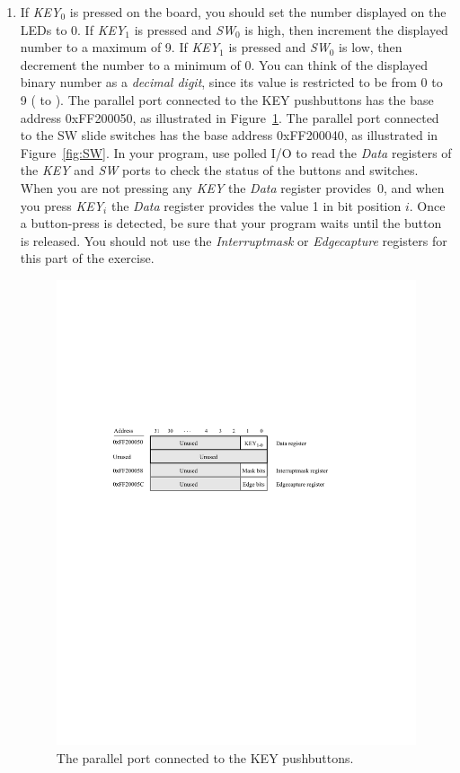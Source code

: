\documentclass[epsfig,10pt,fullpage]{article}
\begin{document}
\begin{enumerate}
\item If {\it KEY}$_0$ is pressed on the board, you should set the number displayed on the
LEDs to 0. If {\it KEY}$_1$ is pressed and {\it SW}$_0$ is high, then increment the displayed
number to a maximum of 9. If {\it KEY}$_1$ is pressed and {\it SW}$_0$ is low, then decrement the
number to a minimum of 0. You can think of the displayed binary number as a {\it decimal digit},
since its value is restricted to be from 0 to 9 ( to ). The 
parallel port connected to the KEY pushbuttons has the base address
{\sf 0xFF200050}, as illustrated in Figure~\ref{fig:KEY}. The parallel port connected to
the SW slide switches has the base address {\sf 0xFF200040}, as illustrated in Figure~\ref{fig:SW}.
In your program, use polled I/O to read the {\it Data} registers of the {\it KEY} and {\it SW}
ports to check the status of the buttons and switches. When you are not pressing 
any {\it KEY} the {\it Data} register provides~0, and when you press {\it KEY}$_i$ the 
{\it Data} register provides the value 1 in bit position $i$. Once a button-press is detected,
be sure that your program waits until the button is released. You should not use the 
{\it Interruptmask} or {\it Edgecapture} registers for this part of the exercise.

\begin{figure}[htb]
	\begin{center}
	\includegraphics[scale=1]{figures/figureKEY.pdf}
	\end{center}
	\caption{The parallel port connected to the KEY pushbuttons.}
\label{fig:KEY}
\end{figure}


\end{enumerate}
\end{document}
